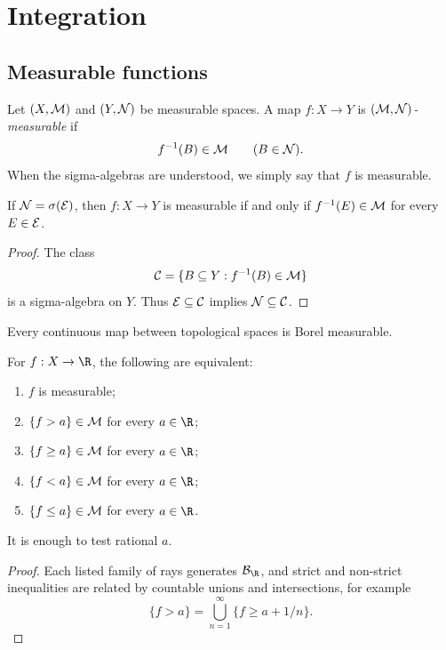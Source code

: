 \chapter{Integration}

\section{Measurable functions}

\begin{de}
Let $(X,\mathcal{M})$ and $(Y,\mathcal{N})$ be measurable spaces. A map $f:X\to Y$ is \emph{$(\mathcal{M},\mathcal{N})$-measurable} if
\[
f^{-1}(B)\in\mathcal{M}\qquad(B\in\mathcal{N}).
\]
When the sigma-algebras are understood, we simply say that $f$ is measurable.
\end{de}

\begin{prop}
If $\mathcal{N}=\sigma(\mathcal{E})$, then $f:X\to Y$ is measurable if and only if $f^{-1}(E)\in\mathcal{M}$ for every $E\in\mathcal{E}$.
\end{prop}

\begin{proof}
The class
\[
\mathcal{C}=\{B\subseteq Y:f^{-1}(B)\in\mathcal{M}\}
\]
is a sigma-algebra on $Y$. Thus $\mathcal{E}\subseteq\mathcal{C}$ implies $\mathcal{N}\subseteq\mathcal{C}$.
\end{proof}

\begin{cor}
Every continuous map between topological spaces is Borel measurable.
\end{cor}

\begin{prop}
For $f:X\to\R$, the following are equivalent:
\begin{enumerate}
  \item $f$ is measurable;
  \item $\{f>a\}\in\mathcal{M}$ for every $a\in\R$;
  \item $\{f\geq a\}\in\mathcal{M}$ for every $a\in\R$;
  \item $\{f<a\}\in\mathcal{M}$ for every $a\in\R$;
  \item $\{f\leq a\}\in\mathcal{M}$ for every $a\in\R$.
\end{enumerate}
It is enough to test rational $a$.
\end{prop}

\begin{proof}
Each listed family of rays generates $\cB_{\R}$, and strict and non-strict inequalities are related by countable unions and intersections, for example
\[
\{f>a\}=\bigcup_{n=1}^{\infty}\{f\geq a+1/n\}.
\]
\end{proof}

